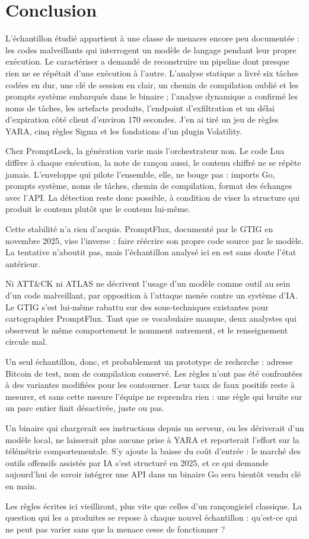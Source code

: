 \chapter*{Conclusion}

L'échantillon étudié appartient à une classe de menaces encore peu documentée : les
codes malveillants qui interrogent un modèle de langage pendant leur propre
exécution. Le caractériser a demandé de reconstruire un pipeline dont presque rien
ne se répétait d'une exécution à l'autre. L'analyse statique a livré six tâches
codées en dur, une clé de session en clair, un chemin de compilation oublié et les
prompts système embarqués dans le binaire ; l'analyse dynamique a confirmé les noms
de tâches, les artefacts produits, l'endpoint d'exfiltration et un délai
d'expiration côté client d'environ 170 secondes. J'en ai tiré un jeu de règles YARA,
cinq règles Sigma et les fondations d'un plugin Volatility.

Chez PromptLock, la génération varie mais l'orchestrateur non. Le code Lua diffère à
chaque exécution, la note de rançon aussi, le contenu chiffré ne se répète jamais.
L'enveloppe qui pilote l'ensemble, elle, ne bouge pas : imports Go, prompts système,
noms de tâches, chemin de compilation, format des échanges avec l'API. La détection
reste donc possible, à condition de viser la structure qui produit le contenu plutôt
que le contenu lui-même.

Cette stabilité n'a rien d'acquis. PromptFlux, documenté par le GTIG en novembre
2025, vise l'inverse : faire réécrire son propre code source par le modèle. La
tentative n'aboutit pas, mais l'échantillon analysé ici en est sans doute l'état
antérieur.

Ni ATT\&CK ni ATLAS ne décrivent l'usage d'un modèle comme outil au sein d'un code
malveillant, par opposition à l'attaque menée contre un système d'IA. Le GTIG s'est
lui-même rabattu sur des sous-techniques existantes pour cartographier PromptFlux.
Tant que ce vocabulaire manque, deux analystes qui observent le même comportement le
nomment autrement, et le renseignement circule mal.

Un seul échantillon, donc, et probablement un prototype de recherche : adresse
Bitcoin de test, nom de compilation conservé. Les règles n'ont pas été confrontées à
des variantes modifiées pour les contourner. Leur taux de faux positifs reste à
mesurer, et sans cette mesure l'équipe ne reprendra rien : une règle qui bruite sur
un parc entier finit désactivée, juste ou pas.

Un binaire qui chargerait ses instructions depuis un serveur, ou les dériverait d'un
modèle local, ne laisserait plus aucune prise à YARA et reporterait l'effort sur la
télémétrie comportementale. S'y ajoute la baisse du coût d'entrée : le marché des
outils offensifs assistés par IA s'est structuré en 2025, et ce qui demande
aujourd'hui de savoir intégrer une API dans un binaire Go sera bientôt vendu clé en
main.

Les règles écrites ici vieilliront, plus vite que celles d'un rançongiciel
classique. La question qui les a produites se repose à chaque nouvel échantillon :
qu'est-ce qui ne peut pas varier sans que la menace cesse de fonctionner ?
